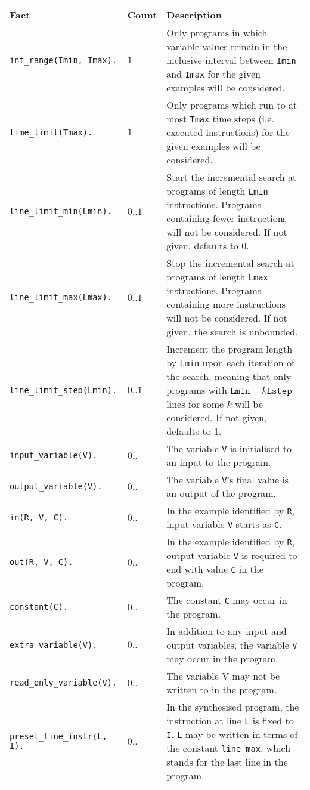 \documentclass[a4paper,twoside,notitlepage,12pt]{article}
\begin{document}
\begin{tabularx}{\textwidth}{|l|l|X|}
\hline
\textbf{Fact} & \textbf{Count} & \textbf{Description} \\
\hline
\verb|int_range(Imin, Imax).| & $1$ &
Only programs in which variable values remain in the inclusive interval 
between \verb|Imin| and \verb|Imax| for the given examples will be considered. \\
\hline
\verb|time_limit(Tmax).| & $1$ &
Only programs which run to at most \verb|Tmax| time steps (i.e. executed 
instructions) for the given examples will be considered. \\
\hline
\verb|line_limit_min(Lmin).| & $0..1$ &
Start the incremental search at programs of length \verb|Lmin| instructions. 
Programs containing fewer instructions will not be considered. If not given, 
defaults to 0. \\
\hline
\verb|line_limit_max(Lmax).| & $0..1$ &
Stop the incremental search at programs of length \verb|Lmax| instructions.
Programs containing more instructions will not be considered. If not given, 
the search is unbounded. \\
\hline
\verb|line_limit_step(Lmin).| & $0..1$ &
Increment the program length by \verb|Lmin| upon each iteration of the search, 
meaning that only programs with $\texttt{Lmin}+k\texttt{Lstep}$ lines for some 
$k$ will be considered. If not given, defaults to 1. \\
\hline
\verb|input_variable(V).| & $0..$ &
The variable \verb|V| is initialised to an input to the program. \\
\hline
\verb|output_variable(V).| & $0..$ &
The variable \verb|V|'s final value is an output of the program. \\
\hline
\verb|in(R, V, C).| & $0..$ &
In the example identified by \verb|R|, input variable \verb|V| starts as \verb|C|. \\
\hline
\verb|out(R, V, C).| & $0..$ &
In the example identified by \verb|R|, output variable \verb|V| is required to 
end with value \verb|C| in the program. \\
\hline
\verb|constant(C).| & $0..$ &
The constant \verb|C| may occur in the program. \\
\hline
\verb|extra_variable(V).| & $0..$ &
In addition to any input and output variables, the variable \verb|V| may occur 
in the program. \\
\hline
\verb|read_only_variable(V).| & $0..$ &
The variable V may not be written to in the program. \\
\hline
\verb|preset_line_instr(L, I).| & $0..$ &
In the synthesised program, the instruction at line \verb|L| is fixed to 
\verb|I|. \verb|L| may be written in terms of the constant \verb|line_max|, 
which stands for the last line in the program. \\
\hline
\end{tabularx}
\end{document}
